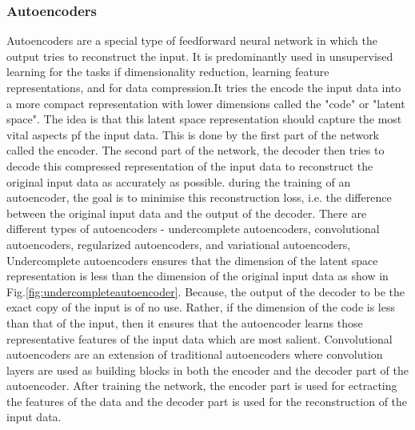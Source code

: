 \subsubsection{Autoencoders}
Autoencoders are a special type of feedforward neural network in which the output tries to reconstruct the input. It is predominantly used in unsupervised learning for the tasks if dimensionality reduction, learning feature representations, and for data compression.It tries the encode the input data into a more compact representation with lower dimensions called the "code"\cite*{Goodfellow-et-al-2016} or "latent space". The idea is that this latent space representation should capture the most vital aspects pf the input data. This is done by the first part of the network called the encoder. The second part of the network, the decoder then tries to decode this compressed representation of the input data to reconstruct the original input data as accurately as possible. during the training of an autoencoder, the goal is to minimise this reconstruction loss, i.e. the difference between the original input data and the output of the decoder. There are different types of autoencoders - undercomplete autoencoders, convolutional autoencoders, regularized autoencoders, and variational autoencoders, \\
Undercomplete autoencoders ensures that the dimension of the latent space representation is less than the dimension of the original input data as show in Fig.\ref*{fig:undercompleteautoencoder}. Because, the output of the decoder to be the exact copy of the input is of no use. Rather, if the dimension of the code is less than that of the input, then it ensures that the autoencoder learns those representative features of the input data which are most salient\cite*{Goodfellow-et-al-2016}. Convolutional autoencoders are an extension of traditional autoencoders where convolution layers are used as building blocks in both the encoder and the decoder part of the autoencoder. After training the network, the encoder part is used for ectracting the features of the data and the decoder part is used for the reconstruction of the input data. \\
